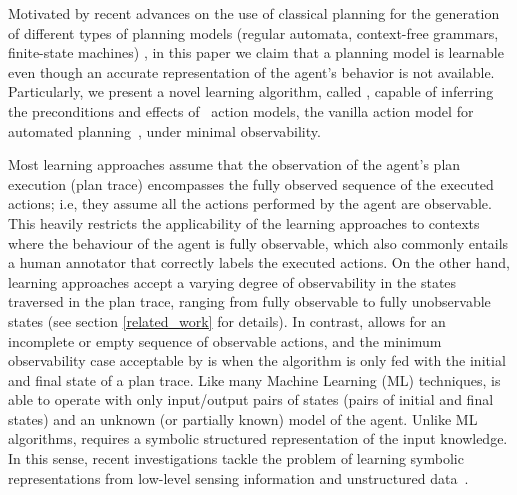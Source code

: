 \textcolor[rgb]{1.00,0.00,0.00}{Motivated by recent advances on the use of classical planning for the generation of different types of planning models (regular automata, context-free grammars, finite-state machines)} \cite{bonet2009automatic,segovia2016generalized,segovia2017generating,segovia:HFSCs:JAIR18}, in this paper we claim that a planning model is learnable even though an accurate representation of the agent's behavior is not available. Particularly, we present a novel learning algorithm, called \FAMA, capable of inferring the preconditions and effects of \strips\ action models, the vanilla action model for automated planning~\cite{fikes1971strips}, under minimal observability.



\textcolor[rgb]{1.00,0.00,0.00}{Most learning approaches assume that the observation of the agent's plan execution (plan trace) encompasses the fully observed sequence of the executed actions; i.e, they assume all the actions performed by the agent are observable. This heavily restricts the applicability of the learning approaches to contexts where the behaviour of the agent is fully observable, which also commonly entails a human annotator that correctly labels the executed actions. On the other hand, learning approaches accept a varying degree of observability in the states traversed in the plan trace, ranging from fully observable to fully unobservable states (see section \ref{related_work} for details).} In contrast, \FAMA allows for an incomplete or empty sequence of observable actions, and the minimum observability case acceptable by \FAMA is when the algorithm is only fed with the initial and final state of a plan trace. Like many Machine Learning (ML) techniques, \FAMA is able to operate with only input/output pairs of states (pairs of initial and final states) and an unknown (or partially known) model of the agent. Unlike ML algorithms, \FAMA requires a symbolic structured representation of the input knowledge. In this sense, recent investigations tackle the problem of learning symbolic representations from low-level sensing information and unstructured data~\cite{KonidarisKL18,AsaiF18}.

